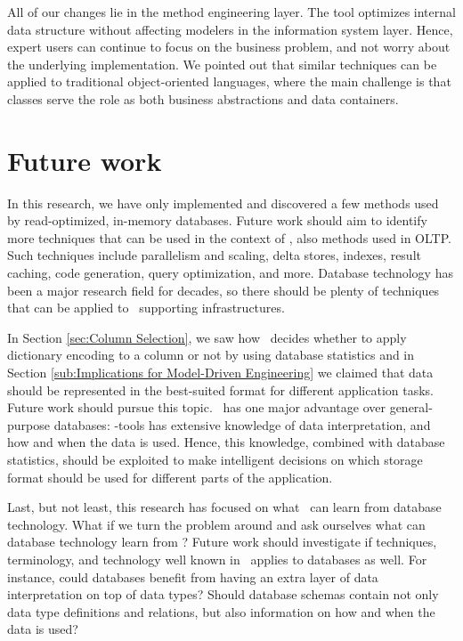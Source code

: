 All of our changes lie in the method engineering layer. The tool optimizes internal data structure without affecting modelers in the information system layer. Hence, expert users can continue to focus on the business problem, and not worry about the underlying implementation. We pointed out that similar techniques can be applied to traditional object-oriented languages, where the main challenge is that classes serve the role as both business abstractions and data containers.

\section{Future work}
\label{sec:Future work}
In this research, we have only implemented and discovered a few methods used by read-optimized, in-memory databases. Future work should aim to identify more techniques that can be used in the context of \mde, also methods used in OLTP. Such techniques include parallelism and scaling, delta stores, indexes, result caching, code generation, query optimization, and more. Database technology has been a major research field for decades, so there should be plenty of techniques that can be applied to \mdd~supporting infrastructures.

In Section \ref{sec:Column Selection}, we saw how \gap~decides whether to apply dictionary encoding to a column or not by using database statistics and in Section \ref{sub:Implications for Model-Driven Engineering} we claimed that data should be represented in the best-suited format for different application tasks. Future work should pursue this topic. \mde~has one major advantage over general-purpose databases: \mdd-tools has extensive knowledge of data interpretation, and how and when the data is used. Hence, this knowledge, combined with database statistics, should be exploited to make intelligent decisions on which storage format should be used for different parts of the application.

Last, but not least, this research has focused on what \mde~can learn from database technology. What if we turn the problem around and ask ourselves what can database technology learn from \mde? Future work should investigate if techniques, terminology, and technology well known in \mde~applies to databases as well. For instance, could databases benefit from having an extra layer of data interpretation on top of data types? Should database schemas contain not only data type definitions and relations, but also information on how and when the data is used?

